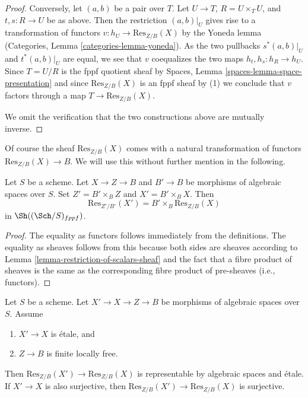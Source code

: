 \begin{proof}
\medskip\noindent
Conversely, let $(a, b)$ be a pair over $T$.
Let $U \to T$, $R = U \times_T U$, and $t, s : R \to U$ be as
above. Then the restriction $(a, b)|_U$ gives rise to a
transformation of functors $v : h_U \to \text{Res}_{Z/B}(X)$ by the
Yoneda lemma
(Categories, Lemma \ref{categories-lemma-yoneda}).
As the two pullbacks $s^*(a, b)|_U$ and $t^*(a, b)|_U$
are equal, we see that $v$ coequalizes the two maps
$h_t, h_s : h_R \to h_U$. Since $T = U/R$ is the fppf quotient sheaf by
Spaces, Lemma \ref{spaces-lemma-space-presentation}
and since $\text{Res}_{Z/B}(X)$ is an fppf sheaf by (1) we conclude
that $v$ factors through a map $T \to \text{Res}_{Z/B}(X)$.

\medskip\noindent
We omit the verification that the two constructions above are mutually
inverse.
\end{proof}

\noindent
Of course the sheaf $\text{Res}_{Z/B}(X)$ comes with a natural transformation
of functors $\text{Res}_{Z/B}(X) \to B$. We will use this without further
mention in the following.

\begin{lemma}
\label{lemma-etale-base-change-restriction-of-scalars}
Let $S$ be a scheme. Let $X \to Z \to B$ and $B' \to B$
be morphisms of algebraic spaces over $S$.
Set $Z' = B' \times_B Z$ and $X' = B' \times_B X$. Then
$$
\text{Res}_{Z'/B'}(X')
=
B' \times_B \text{Res}_{Z/B}(X)
$$
in $\Sh((\Sch/S)_{fppf})$.
\end{lemma}

\begin{proof}
The equality as functors follows immediately from the definitions.
The equality as sheaves follows from this because both sides are
sheaves according to
Lemma \ref{lemma-restriction-of-scalars-sheaf}
and the fact that a fibre product of sheaves is the same as the
corresponding fibre product of pre-sheaves (i.e., functors).
\end{proof}

\begin{lemma}
\label{lemma-etale-covering-restriction-of-scalars}
Let $S$ be a scheme. Let $X' \to X \to Z \to B$ be morphisms of
algebraic spaces over $S$. Assume
\begin{enumerate}
\item $X' \to X$ is \'etale, and
\item $Z \to B$ is finite locally free.
\end{enumerate}
Then $\text{Res}_{Z/B}(X') \to \text{Res}_{Z/B}(X)$ is representable
by algebraic spaces and \'etale. If $X' \to X$ is also surjective,
then $\text{Res}_{Z/B}(X') \to \text{Res}_{Z/B}(X)$ is surjective.
\end{lemma}

